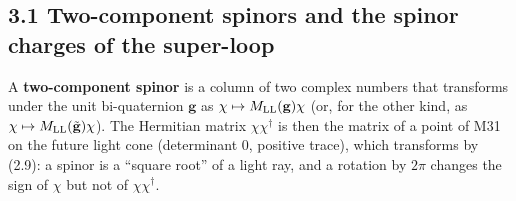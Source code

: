\documentclass[
  10pt,
]{article}
\begin{document}
\hypertarget{two-component-spinors-and-the-spinor-charges-of-the-super-loop}{%
\subsection{3.1 Two-component spinors and the spinor charges of the
super-loop}\label{two-component-spinors-and-the-spinor-charges-of-the-super-loop}}

A \textbf{two-component spinor} is a column of two complex numbers that
transforms under the unit bi-quaternion \(\mathbf g\) as
\(\chi\mapsto M_{\rm LL}(\mathbf g)\chi\) (or, for the other kind, as
\(\chi\mapsto M_{\rm LL}(\tilde{\mathbf g})\chi\)). The Hermitian matrix
\(\chi\chi^\dagger\) is then the matrix of a point of M31 on the future
light cone (determinant 0, positive trace), which transforms by (2.9): a
spinor is a ``square root'' of a light ray, and a rotation by \(2\pi\)
changes the sign of \(\chi\) but not of \(\chi\chi^\dagger\).
\end{document}

